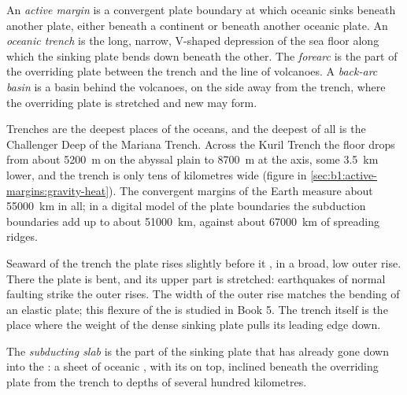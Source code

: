 \begin{definition}\label{def:b1:active-margins:active-margin}
An \emph{active margin} is a convergent plate boundary at
which oceanic  sinks beneath another plate, either beneath a
continent or beneath another oceanic plate. An \emph{oceanic
trench} is the long, narrow, V-shaped depression of the
sea floor along which the sinking plate bends down beneath the other. The
\emph{forearc} is the part of the overriding plate between the
trench and the line of volcanoes. A \emph{back-arc basin}
is a basin behind the volcanoes, on the side away from the trench, where the
overriding plate is stretched and new  may form.
\end{definition}

Trenches are the deepest places of the oceans, and the deepest of all is the
Challenger Deep of the Mariana Trench. Across the Kuril Trench the floor drops
from about \qty{5200}{m} on the abyssal plain to \qty{8700}{m} at the axis,
some \qty{3.5}{km} lower, and the trench is only tens of kilometres wide
(figure in \cref{sec:b1:active-margins:gravity-heat}). The convergent margins
of the Earth measure about \qty{55000}{km} in all; in a digital model of the
plate boundaries the subduction boundaries add up to about \qty{51000}{km},
against about \qty{67000}{km} of spreading ridges.

Seaward of the trench the plate rises slightly before it , in a broad,
low outer rise. There the plate is bent, and its upper part is stretched:
earthquakes of normal faulting strike the outer rises. The width of the outer
rise matches the bending of an elastic plate; this flexure of the 
is studied in Book 5. The trench itself is the place where the weight of the
dense sinking plate pulls its leading edge down.

\begin{definition}\label{def:b1:active-margins:slab}
The \emph{subducting slab} is the part of the sinking
plate that has already gone down into the : a sheet of oceanic
, with its  on top, inclined beneath the overriding plate from
the trench to depths of several hundred kilometres.
\end{definition}

